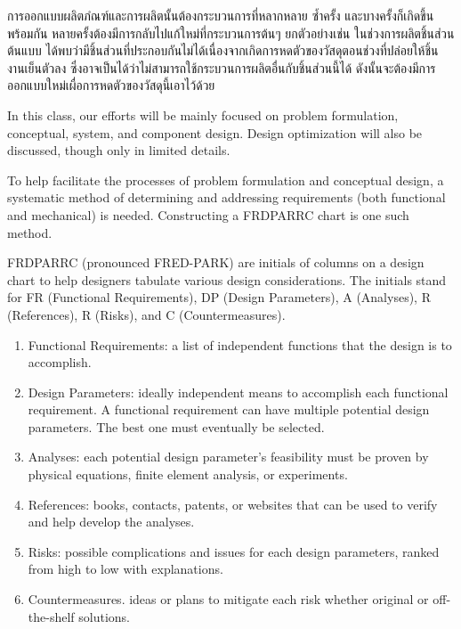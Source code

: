 \documentclass[a4paper,openany,nobib]{tufte-book}
\begin{document}
การออกแบบผลิตภํณฑ์และการผลิตนั้นต้องกระบวนการที่หลากหลาย ซ้ำครั้ง และบางครั้งก็เกิดขึ้นพร้อมกัน หลายครั้งต้องมีการกลับไปแก้ใหม่ที่กระบวนการต้นๆ ยกตัวอย่างเช่น ในช่วงการผลิตชิ้นส่วนต้นแบบ ได้พบว่ามีชิ้นส่วนที่ประกอบกันไม่ได้เนื่องจากเกิดการหดตัวของวัสดุตอนช่วงที่ปล่อยให้ชิ้นงานเย็นตัวลง ซึ่งอาจเป็นได้ว่าไม่สามารถใช้กระบวนการผลิตอื่นกับชิ้นส่วนนี้ได้ ดังนั้นจะต้องมีการออกแบบใหม่เผื่อการหดตัวของวัสดุนี้เอาไว้ด้วย

In this class, our efforts will be mainly focused on problem
formulation, conceptual, system, and component design. Design
optimization will also be discussed, though only in limited details.

To help facilitate the processes of problem formulation and conceptual
design, a systematic method of determining and addressing requirements
(both functional and mechanical) is needed. Constructing a FRDPARRC
chart is one such method.

FRDPARRC (pronounced FRED-PARK) are initials of columns on a design
chart to help designers tabulate various design considerations. The
initials stand for FR (Functional Requirements), DP (Design Parameters),
A (Analyses), R (References), R (Risks), and C (Countermeasures).

\begin{enumerate}
\item Functional Requirements: a list of independent functions that the
design is to accomplish.

\item Design Parameters: ideally independent means to accomplish each
functional requirement. A functional requirement can have multiple
potential design parameters. The best one must eventually be
selected.

\item Analyses: each potential design parameter's feasibility must be
proven by physical equations, finite element analysis, or
experiments.

\item References: books, contacts, patents, or websites that can be used to
verify and help develop the analyses.

\item Risks: possible complications and issues for each design parameters,
ranked from high to low with explanations.

\item Countermeasures. ideas or plans to mitigate each risk whether
original or off-the-shelf solutions.
\end{enumerate}
\end{document}
